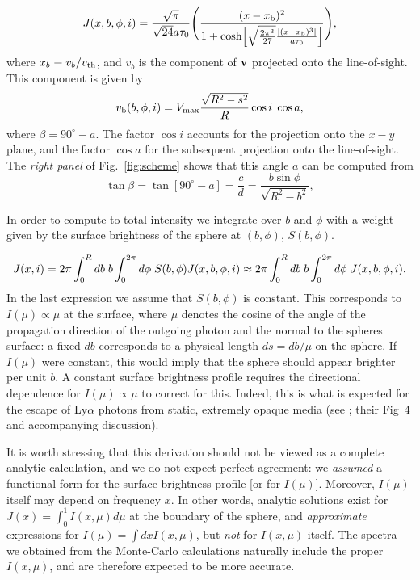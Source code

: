 \documentclass{emulateapj}
\newcommand{\hs}{{\hspace{1mm}}}
\begin{document}
\begin{displaymath}
J(x,b,\phi,i)=\frac{\sqrt{\pi}}{\sqrt{24}a\tau_0}\Bigg{(}\frac{(x-x_{\rm
    b})^2}{1+{\rm cosh}\Big{[}\sqrt{\frac{2\pi^3}{27}}\frac{|(x
      -x_{\rm b})^3|}{a\tau_0}\Big{]}}\Bigg{)},
\end{displaymath} 
%
where $x_b\equiv v_{b}/v_{\rm th}$, and $v_b$ is the component of ${\bf v}$ projected onto the line-of-sight. This component is given by
\begin{equation}
v_{\rm b}(b,\phi,i)=V_{\rm max}\frac{\sqrt{R^2 -s^2}}{R}\cos i  \hs
\cos a,
\end{equation}
where $\beta = 90^{\circ}-a$. The factor $\cos i$ accounts for the projection onto the $x-y$ plane, and the factor $\cos a$ for the subsequent projection onto the line-of-sight. The {\it right panel} of Fig.~\ref{fig:scheme} shows that this angle $a$ can be computed from
%
\begin{equation}
\tan \beta =\tan[90^{\circ}-a]=\frac{c}{d}=\frac{ b\sin \phi}{\sqrt{R^2 -b^2}},
\end{equation}
%

In order to compute to total intensity we integrate over $b$ and
$\phi$ with a weight given by the surface brightness of the
sphere at $(b,\phi)$, $S(b,\phi)$.

\begin{displaymath}
J(x,i)=2\pi \int_0^Rdb \hs b \int_0^{2\pi}d\phi \hs
S(b,\phi)J(x,b,\phi,i) \approx 2\pi \int_0^Rdb \hs b
\int_0^{2\pi}d\phi \hs J(x,b,\phi,i)\\ \nonumber.
\end{displaymath}
%
In the last expression we assume that $S(b,\phi)$ is constant. 
This corresponds to $I(\mu) \propto \mu$ at the surface, where $\mu$
denotes the cosine of the angle of the propagation direction of the
outgoing photon and the normal to the spheres surface: a fixed $db$
corresponds to a physical length $ds = db/\mu$ on the sphere.  
If $I(\mu)$ were constant, this would imply that the sphere should
appear brighter per unit $b$. 
A constant surface brightness profile requires the directional
dependence for $I(\mu) \propto \mu$ to correct for this. 
Indeed, this is what is expected for the escape of Ly$\alpha$ photons
from static, extremely opaque media (see \citet{Ahn01}; their
Fig~4 and accompanying discussion). 

It is worth stressing that this derivation should not be viewed as a
complete analytic calculation, and we do not expect perfect agreement:
we {\it assumed} a functional form for the surface brightness profile
[or for $I(\mu)$]. Moreover, $I(\mu)$ itself may depend on frequency $x$. In other words, analytic solutions exist for $J(x) =
\int_0^1 I(x,\mu) d\mu$ at the boundary of the sphere, and {\it approximate}
expressions for $I(\mu) =\int dx I(x,\mu)$, but {\it not} for $I(x,\mu)$
itself. The spectra we obtained from the Monte-Carlo calculations naturally include the proper $I(x,\mu)$, and are therefore expected to be more accurate.
\end{document}
